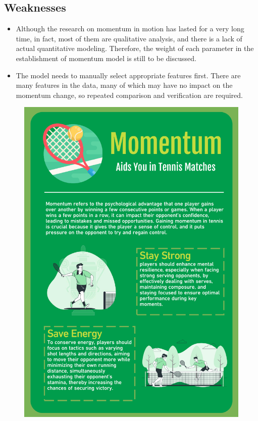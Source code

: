 \documentclass{mcmthesis}  %
\begin{document}
\subsection{Weaknesses}
\begin{itemize}
\item{Although the research on momentum in motion has lasted for a very long time, in fact, most of them are qualitative analysis, and there is a lack of actual quantitative modeling. Therefore, the weight of each parameter in the establishment of momentum model is still to be discussed.}
\item{The model needs to manually select appropriate features first. There are many features in the data, many of which may have no impact on the momentum change, so repeated comparison and verification are required.}
\end{itemize}

\newpage
\begin{figure}[!H]
\centering
\includegraphics[width=\textwidth]{figures/memo.pdf} %
\end{figure}
\end{document}
